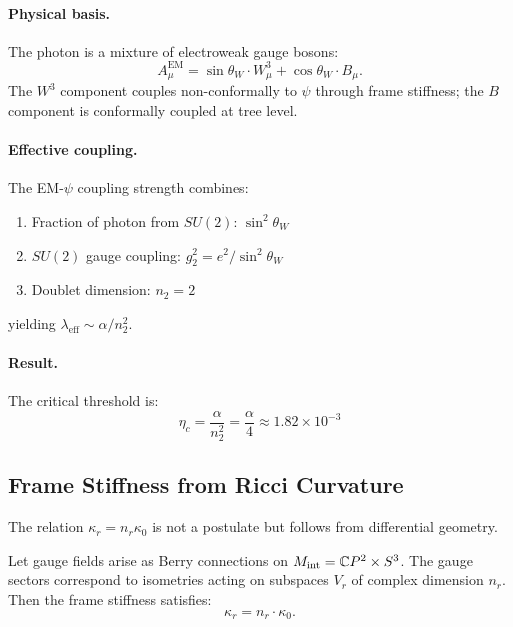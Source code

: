 \paragraph{Physical basis.}
The photon is a mixture of electroweak gauge bosons:
\begin{equation}
A_\mu^{\text{EM}} = \sin\theta_W \cdot W^3_\mu + \cos\theta_W \cdot B_\mu.
\end{equation}
The $W^3$ component couples non-conformally to $\psi$ through frame stiffness; the $B$ component is conformally coupled at tree level.

\paragraph{Effective coupling.}
The EM-$\psi$ coupling strength combines:
\begin{enumerate}
\item Fraction of photon from $SU(2)$: $\sin^2\theta_W$
\item $SU(2)$ gauge coupling: $g_2^2 = e^2/\sin^2\theta_W$
\item Doublet dimension: $n_2 = 2$
\end{enumerate}
yielding $\lambda_{\text{eff}} \sim \alpha/n_2^2$.

\paragraph{Result.}
The critical threshold is:
\begin{equation}
\boxed{\eta_c = \frac{\alpha}{n_2^2} = \frac{\alpha}{4} \approx 1.82 \times 10^{-3}}
\end{equation}

\subsection{Frame Stiffness from Ricci Curvature}\label{app:frame-ricci}

The relation $\kappa_r = n_r \kappa_0$ is not a postulate but follows from differential geometry.

\begin{theorem}\label{thm:frame-ricci}
Let gauge fields arise as Berry connections on $M_{\rm int} = \mathbb{C}P^2 \times S^3$. 
The gauge sectors correspond to isometries acting on subspaces $V_r$ of complex dimension $n_r$.
Then the frame stiffness satisfies:
\begin{equation}
\kappa_r = n_r \cdot \kappa_0.
\end{equation}
\end{theorem}

